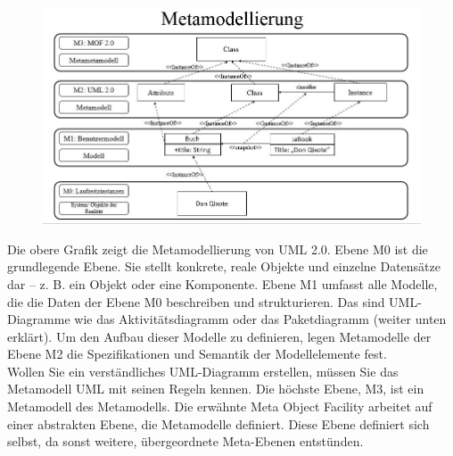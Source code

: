 \begin{center}
\begin{figure}[h]
   
\includegraphics[scale=0.7]{Graphics/metamodell.jpg} 





\label{fig1}


\end{figure}
\end{center}
\newpage

Die obere Grafik zeigt die Metamodellierung von UML 2.0. Ebene M0 ist die grundlegende Ebene. Sie stellt konkrete, reale Objekte und einzelne Datensätze dar – z. B. ein Objekt oder eine Komponente. Ebene M1 umfasst alle Modelle, die die Daten der Ebene M0 beschreiben und strukturieren. Das sind UML-Diagramme wie das Aktivitätsdiagramm oder das Paketdiagramm (weiter unten erklärt). Um den Aufbau dieser Modelle zu definieren, legen Metamodelle der Ebene M2 die Spezifikationen und Semantik der Modellelemente fest.\\

Wollen Sie ein verständliches UML-Diagramm erstellen, müssen Sie das Metamodell UML mit seinen Regeln kennen. Die höchste Ebene, M3, ist ein Metamodell des Metamodells. Die erwähnte Meta Object Facility arbeitet auf einer abstrakten Ebene, die Metamodelle definiert. Diese Ebene definiert sich selbst, da sonst weitere, übergeordnete Meta-Ebenen entstünden.\\

